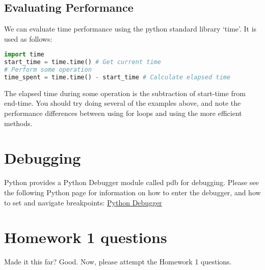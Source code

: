 \documentclass[11pt]{article}
\begin{document}
\subsection{Evaluating Performance}

We can evaluate time performance using the python standard library `time'. It is used as follows:
\begin{lstlisting}[language=python]
import time
start_time = time.time() # Get current time
# Perform some operation
time_spent = time.time() - start_time # Calculate elapsed time
\end{lstlisting}
The elapsed time during some operation is the subtraction of start-time from end-time. You should try doing several of the examples above, and note the performance differences between using for loops and using the more efficient methods.


\section{Debugging}
\label{sec:debugger}

Python provides a Python Debugger module called pdb for debugging. Please see the following Python page for information on how to enter the debugger, and how to set and navigate breakpoints:
\href{https://docs.python.org/3/library/pdb.html}{Python Debugger}


\section{Homework 1 questions}
Made it this far? Good. Now, please attempt the Homework 1 questions.
\end{document}

